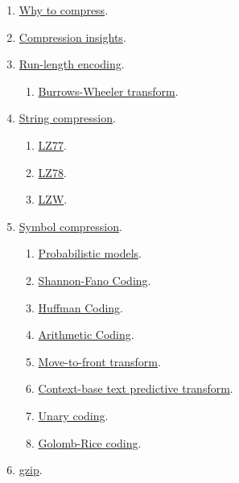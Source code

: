 \begin{enumerate}
\item \href{https://cdn.rawgit.com/vicente-gonzalez-ruiz/why_to_compress/master/index.html}{Why to compress}.
\item \href{https://cdn.rawgit.com/vicente-gonzalez-ruiz/compression_insights/master/index.html}{Compression insights}.
\item \href{https://cdn.rawgit.com/vicente-gonzalez-ruiz/Run-length_encoding/master/index.html}{Run-length encoding}.
  \begin{enumerate}
  \item \href{https://cdn.rawgit.com/vicente-gonzalez-ruiz/Burrows-Wheeler_transform/master/index.html}{Burrows-Wheeler transform}.
  \end{enumerate}
\item \href{https://cdn.rawgit.com/vicente-gonzalez-ruiz/string_compression/master/index.html}{String compression}.
  \begin{enumerate}
  \item \href{https://cdn.rawgit.com/vicente-gonzalez-ruiz/LZ77/master/index.html}{LZ77}.
  \item \href{https://cdn.rawgit.com/vicente-gonzalez-ruiz/LZ78/master/index.html}{LZ78}.
  \item \href{https://cdn.rawgit.com/vicente-gonzalez-ruiz/LZW/master/index.html}{LZW}.
  \end{enumerate}
\item \href{https://cdn.rawgit.com/vicente-gonzalez-ruiz/symbol_compression/master/index.htm}{Symbol compression}.
  \begin{enumerate}
  \item \href{https://cdn.rawgit.com/vicente-gonzalez-ruiz/probabilistic_models/master/index.html}{Probabilistic models}.
  \item \href{https://cdn.rawgit.com/vicente-gonzalez-ruiz/Shannon-Fano_coding/master/index.html}{Shannon-Fano Coding}.
  \item \href{https://cdn.rawgit.com/vicente-gonzalez-ruiz/Huffman_coding/master/index.html}{Huffman Coding}.
  \item \href{https://cdn.rawgit.com/vicente-gonzalez-ruiz/arithmetic_coding/master/index.html}{Arithmetic Coding}.
  \item \href{https://cdn.rawgit.com/vicente-gonzalez-ruiz/move-to-front_transform/master/index.html}{Move-to-front transform}.
  \item \href{https://cdn.rawgit.com/vicente-gonzalez-ruiz/context-based_text_predictive_transform/master/index.html}{Context-base text predictive transform}.
  \item \href{https://cdn.rawgit.com/vicente-gonzalez-ruiz/unary_coding/master/index.html}{Unary coding}.
  \item \href{https://cdn.rawgit.com/vicente-gonzalez-ruiz/Golomb-Rice_coding/master/index.html}{Golomb-Rice coding}.
  \end{enumerate}
\item \href{https://cdn.rawgit.com/vicente-gonzalez-ruiz/gzip/master/index.html}{gzip}.
\end{enumerate}


